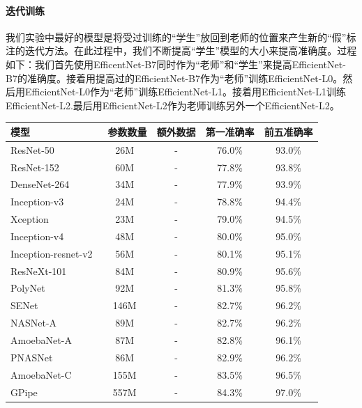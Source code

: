 \documentclass[10pt]{article}
\begin{document}
\paragraph{迭代训练}
我们实验中最好的模型是将受过训练的“学生”放回到老师的位置来产生新的“假”标注的迭代方法。在此过程中，我们不断提高“学生”模型的大小来提高准确度。过程如下：我们首先使用EfficentNet-B7同时作为“老师”和“学生”来提高EfficientNet-B7的准确度。接着用提高过的EfficientNet-B7作为“老师”训练EfficientNet-L0。然后用EfficientNet-L0作为“老师”训练EfficientNet-L1。接着用EfficientNet-L1训练EfficientNet-L2.最后用EfficientNet-L2作为老师训练另外一个EfficientNet-L2。

\begin{table}[h!]
	\small
	\centering      
	\begin{tabular}{l|cc|cc}                                                
		\toprule 
		模型 & \ 参数数量 & 额外数据  &  第一准确率  &  前五准确率   \\
		\midrule       
		ResNet-50 \cite{he2016deep} & 26M & -  & 76.0\% & 93.0\%   \\
		ResNet-152 \cite{he2016deep} & 60M  & - &  77.8\% & 93.8\% \\
		DenseNet-264 \cite{huang2017densely} & 34M & - & 77.9\% & 93.9\%   \\
		Inception-v3 \cite{szegedy2016rethinking}& 24M  & - & 78.8\% & 94.4\%  \\
		Xception \cite{chollet2017xception} & 23M & - & 79.0\%   & 94.5\%  \\
		Inception-v4 \cite{szegedy2017inception} & 48M  & - & 80.0\% & 95.0\%  \\  
		Inception-resnet-v2  \cite{szegedy2017inception} & 56M & - & 80.1\% & 95.1\% \\  
		ResNeXt-101 \cite{xie2017aggregated}  & 84M   & - & 80.9\% & 95.6\% \\
		PolyNet \cite{zhang2017polynet}  & 92M  & - & 81.3\%  & 95.8\% \\
		SENet \cite{hu2018squeeze} & 146M & - & 82.7\% & 96.2\%   \\
		NASNet-A \cite{zoph2018learning} & 89M & - & 82.7\% & 96.2\%   \\
		AmoebaNet-A \cite{real2019regularized} & 87M & - & 82.8\% & 96.1\%   \\
		PNASNet \cite{liu2018progressive} & 86M  & - & 82.9\% & 96.2\%  \\
		AmoebaNet-C  \cite{cubuk2018autoaugment}  & 155M  & - &  83.5\%  & 96.5\% \\
		GPipe \cite{gpipe18} & 557M & - & 84.3\%  & 97.0\%   \\

\end{tabular}
\end{table}
\end{document}
